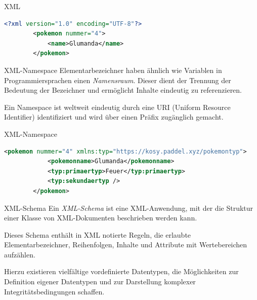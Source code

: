 \begin{example}{XML}
    \begin{lstlisting}[language=XML]
        <?xml version="1.0" encoding="UTF-8"?>
        <pokemon nummer="4">
            <name>Glumanda</name>
        </pokemon>
    \end{lstlisting}
\end{example}

\begin{defi}{XML-Namespace}
    Elementarbezeichner haben ähnlich wie Variablen in Programmiersprachen einen \emph{Namensraum}.
    Dieser dient der Trennung der Bedeutung der Bezeichner und ermöglicht Inhalte eindeutig zu referenzieren.
    
    Ein Namespace ist weltweit eindeutig durch eine URI (Uniform Resource Identifier) identifiziert und wird über einen Präfix zugänglich gemacht.
\end{defi}

\begin{example}{XML-Namespace}
    \begin{lstlisting}[language=XML]
        <pokemon nummer="4" xmlns:typ="https://kosy.paddel.xyz/pokemontyp">
            <pokemonname>Glumanda</pokemonname>
            <typ:primaertyp>Feuer</typ:primaertyp>
            <typ:sekundaertyp />
        </pokemon>
    \end{lstlisting}
\end{example}

\begin{defi}{XML-Schema}
    Ein \emph{XML-Schema} ist eine XML-Anwendung, mit der die Struktur einer Klasse von XML-Dokumenten beschrieben werden kann.
    
    Dieses Schema enthält in XML notierte Regeln, die erlaubte Elementarbezeichner, Reihenfolgen, Inhalte und Attribute mit Wertebereichen aufzählen.
    
    Hierzu existieren vielfältige vordefinierte Datentypen, die Möglichkeiten zur Definition eigener Datentypen und zur Darstellung komplexer Integritätsbedingungen schaffen.
\end{defi}

